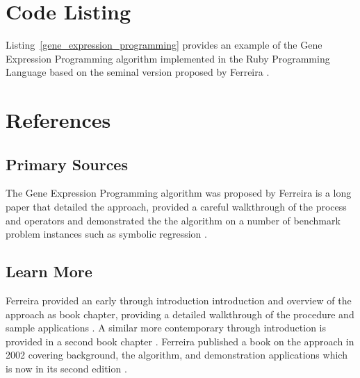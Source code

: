\documentclass[a4paper, 11pt]{article}
\begin{document}
\section{Code Listing}
\label{sec:code}
Listing~\ref{gene_expression_programming} provides an example of the Gene Expression Programming algorithm implemented in the Ruby Programming Language based on the seminal version proposed by Ferreira \cite{Ferreira2001}.




\section{References}
\label{sec:references}

% 
% 
\subsection{Primary Sources}
The Gene Expression Programming algorithm was proposed by Ferreira is a long paper that detailed the approach, provided a careful walkthrough of the process and operators and demonstrated the the algorithm on a number of benchmark problem instances such as symbolic regression \cite{Ferreira2001}.

% 
% 
\subsection{Learn More}
Ferreira provided an early through introduction introduction and overview of the approach as book chapter, providing a detailed walkthrough of the procedure and sample applications \cite{Ferreira2002}. A similar more contemporary through introduction is provided in a second book chapter \cite{Ferreira2005}.
Ferreira published a book on the approach in 2002 covering background, the algorithm, and demonstration applications which is now in its second edition \cite{Ferreira2006}.
\end{document}
